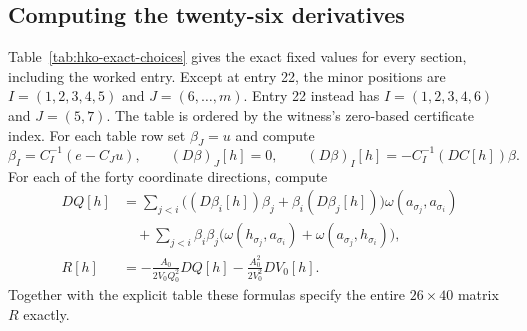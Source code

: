 \subsection{Computing the twenty-six derivatives}
\label{subsec:hko-local-maximum-computation-with-sagemath}
Table~\ref{tab:hko-exact-choices} gives the exact fixed values for every section,
including the worked entry. Except at entry 22, the minor positions are $I=(1,2,3,4,5)$ and
$J=(6,\ldots,m)$. Entry 22 instead has $I=(1,2,3,4,6)$ and $J=(5,7)$.
The table is ordered by the witness's zero-based certificate
index. For each table row set $\beta_J=u$ and compute
\[
 \beta_I=C_I^{-1}(e-C_Ju),\qquad
 (D\beta)_J[h]=0,\qquad
 (D\beta)_I[h]=-C_I^{-1}(DC[h])\beta.
\]
For each of the forty coordinate directions, compute
\begin{align*}
 DQ[h]&=\sum_{j<i}\bigl((D\beta_i[h])\beta_j+\beta_i(D\beta_j[h])\bigr)
       \omega(a_{\sigma_j},a_{\sigma_i})\\
 &\quad+\sum_{j<i}\beta_i\beta_j
 \bigl(\omega(h_{\sigma_j},a_{\sigma_i})+\omega(a_{\sigma_j},h_{\sigma_i})\bigr),\\
 R[h]&=-\frac{A_0}{2V_0Q_0^2}DQ[h]
       -\frac{A_0^2}{2V_0^2}DV_0[h].
\end{align*}
Together with the explicit table these formulas specify the entire
$26\times40$ matrix $R$ exactly.

